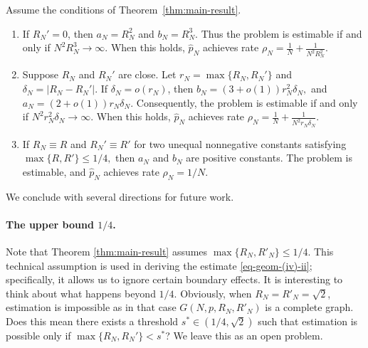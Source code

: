 \documentclass[ECP,preprint]{ejpecp} %
\newcommand{\1}{\mathbf 1}
\begin{document}
\begin{corollary}
Assume the conditions of Theorem~\ref{thm:main-result}.
\begin{enumerate}[label=\textup{(\alph*)}]
\item If \(R_N'=0\), then
\(
    a_N=R_N^2
\)
and
\(
    b_N=R_N^3.
\)
Thus the problem is estimable if and only if
\(
    N^2R_N^3\to\infty.
\)
When this holds, \(\widehat p_N\) achieves rate
\(
    \rho_N
    =
    \frac1N+\frac{1}{N^2R_N^2}.
\)

\item Suppose \(R_N\) and \(R_N'\) are close.  Let
\(
    r_N=\max\{R_N,R_N'\}
\)
and
\(
    \delta_N=|R_N-R_N'|.
\)
If \(\delta_N=o(r_N)\), then
\(
    b_N=(3+o(1))r_N^2\delta_N,
\)
and
\(
    a_N=(2+o(1))r_N\delta_N.
\)
Consequently, the problem is estimable if and only if
\(
    N^2r_N^2\delta_N\to\infty.
\)
When this holds, \(\widehat p_N\) achieves rate
\(
    \rho_N
    =
    \frac1N+\frac{1}{N^2r_N\delta_N}.
\)

\item If \(R_N\equiv R\) and \(R_N'\equiv R'\) for two unequal
nonnegative constants satisfying
\(
    \max\{R,R'\}\le1/4,
\)
then \(a_N\) and \(b_N\) are positive constants.  The problem is estimable, and \(\widehat p_N\) achieves rate
\(
    \rho_N=1/N.
\)
\end{enumerate}
\end{corollary}


\noindent We conclude with several directions for future work.

\paragraph{The upper bound $1/4$.} Note that Theorem \ref{thm:main-result} assumes $\max\{R_N,R'_N\}\leq 1/4$. This technical assumption is used in deriving the estimate \eqref{eq-geom-(iv)-ii}; specifically, it allows us to ignore certain boundary effects. It is interesting to think about what happens beyond $1/4$. Obviously, when $R_N=R'_N=\sqrt{2}$, estimation is impossible as in that case $G(N,p,R_N,R'_N)$ is a complete graph. Does this mean there exists a threshold $s^*\in (1/4,\sqrt{2})$ such that estimation is possible only if $\max\{R_N,R_N'\}<s^*$? We leave this as an open problem.
\end{document}
